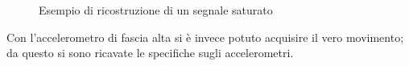 
	\begin{figure}
		\begin{center}
		\caption{Esempio di ricostruzione di un segnale saturato}
		\label{fig:ricostruzione}
		\end{center}
	\end{figure}

	Con l'accelerometro di fascia alta si è invece potuto acquisire
    il vero movimento; da questo si sono ricavate le specifiche
    sugli accelerometri.
    
